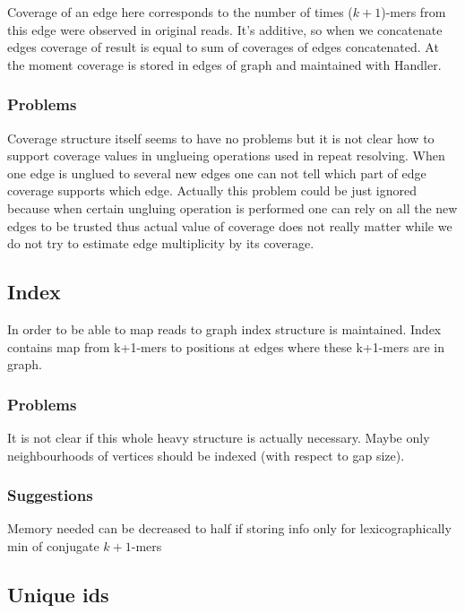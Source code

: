 \documentclass[12pt]{article}
\begin{document}
Coverage of an edge here corresponds to the number of times ($k+1$)-mers from this edge were observed in original reads. It's additive, so when we concatenate edges coverage of result is equal to sum of coverages of edges concatenated. At the moment coverage is stored in edges of graph and maintained with Handler.

\subsubsection{Problems}

Coverage structure itself seems to have no problems but it is not clear how to support coverage values in unglueing operations used in repeat resolving. When one edge is unglued to several new edges one can not tell which part of edge coverage supports which edge. Actually this problem could be just ignored because when certain ungluing operation is performed one can rely on all the new edges to be trusted thus actual value of coverage does not really matter while we do not try to estimate edge multiplicity by its coverage.


\subsection{Index}

In order to be able to map reads to graph index structure is maintained. Index contains map from k+1-mers to positions at edges where these k+1-mers are in graph.

\subsubsection{Problems}

It is not clear if this whole heavy structure is actually necessary. Maybe only neighbourhoods of vertices should be indexed (with respect to gap size).


\subsubsection{Suggestions}
Memory needed can be decreased to half if storing info only for lexicographically min of conjugate $k+1$-mers

\subsection{Unique ids}
\end{document}
